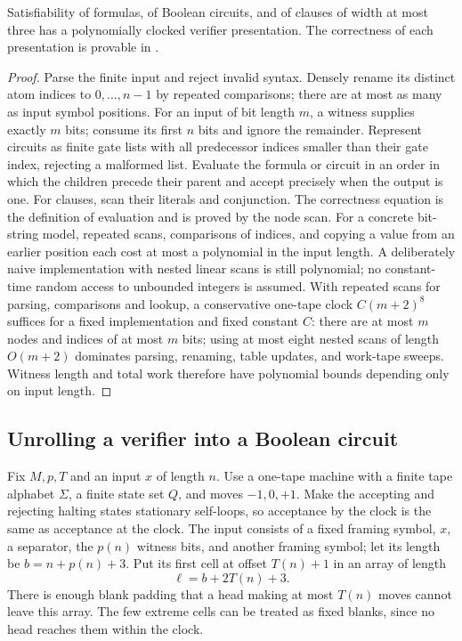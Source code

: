 \begin{proposition}\label{thm:sat-np}
Satisfiability of formulas, of Boolean circuits, and of clauses of width
at most three has a polynomially clocked verifier presentation. The
correctness of each presentation is provable in \ipra.
\end{proposition}
\begin{proof}
Parse the finite input and reject invalid syntax. Densely rename its
distinct atom indices to $0,\ldots,n-1$ by repeated comparisons; there are
at most as many as input symbol positions. For an input of bit length $m$,
a witness supplies exactly $m$ bits; consume its first $n$ bits and ignore
the remainder. Represent circuits as finite gate lists with all predecessor
indices smaller than their gate index, rejecting a malformed list.
Evaluate the formula or circuit in an order in which the children precede
their parent and accept precisely when the output is one. For clauses,
scan their literals and conjunction. The correctness equation is the
definition of evaluation and is proved by the node scan.
For a concrete bit-string model, repeated scans, comparisons of indices,
and copying a value from an earlier position each cost at most a polynomial
in the input length. A deliberately naive implementation with nested
linear scans is still polynomial; no constant-time random access to
unbounded integers is assumed. With repeated scans for parsing, comparisons
and lookup, a conservative one-tape clock $C(m+2)^8$ suffices for a fixed
implementation and fixed constant $C$: there are at most $m$ nodes and
indices of at most $m$ bits; using at most eight nested scans of length
$O(m+2)$ dominates parsing, renaming, table updates, and work-tape sweeps.
Witness length and total work therefore have polynomial bounds depending
only on input length.
\end{proof}

\subsection{Unrolling a verifier into a Boolean circuit}

Fix $M,p,T$ and an input $x$ of length $n$. Use a one-tape machine with a
finite tape alphabet $\Sigma$, a finite state set $Q$, and moves
$-1,0,+1$. Make the accepting and rejecting halting states stationary
self-loops, so acceptance by the clock is the same as acceptance at the
clock. The input consists of a fixed framing symbol, $x$, a separator,
the $p(n)$ witness bits, and another framing symbol; let its length be
$b=n+p(n)+3$. Put its first cell at offset $T(n)+1$ in an array of length
\[
                 \ell=b+2T(n)+3.
\]
There is enough blank padding that a head making at most $T(n)$ moves
cannot leave this array. The few extreme cells can be treated as fixed
blanks, since no head reaches them within the clock.

